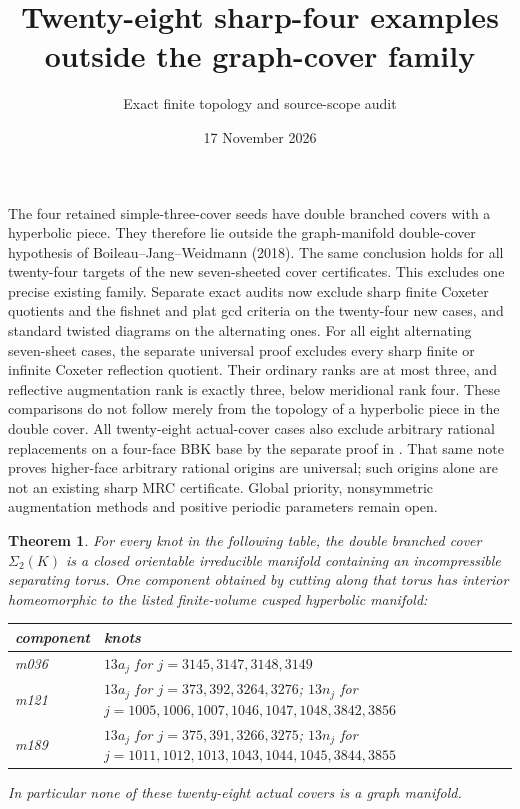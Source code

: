 \documentclass[11pt]{article}
\title{Twenty-eight sharp-four examples outside the graph-cover family}
\author{Exact finite topology and source-scope audit}
\date{17 November 2026}
\newtheorem{theorem}{Theorem}
\begin{document}
\maketitle

The four retained simple-three-cover seeds have double branched covers
with a hyperbolic piece. They therefore lie outside the graph-manifold
double-cover hypothesis of Boileau--Jang--Weidmann (2018).
The same conclusion holds for all twenty-four targets of the new seven-sheeted cover certificates.
This excludes one precise existing family. Separate exact audits now
exclude sharp finite Coxeter quotients and the fishnet and plat gcd
criteria on the twenty-four new cases, and standard twisted diagrams
on the alternating ones. For all eight alternating seven-sheet cases,
the separate universal proof excludes every sharp finite or infinite
Coxeter reflection quotient. Their ordinary ranks are at most three,
and reflective augmentation rank is exactly three, below meridional
rank four. These comparisons do not follow merely from the topology
of a hyperbolic piece in the double cover.
All twenty-eight actual-cover cases also exclude arbitrary rational
replacements on a four-face BBK base by the separate proof in
. That same note proves
higher-face arbitrary rational origins are universal; such origins
alone are not an existing sharp MRC certificate.
Global priority, nonsymmetric augmentation methods and positive
periodic parameters remain open.

\begin{theorem}\label{thm:outside}
For every knot in the following table, the double branched cover
$\Sigma_2(K)$ is a closed orientable irreducible manifold containing an
incompressible separating torus. One component obtained by cutting
along that torus has interior homeomorphic to the listed finite-volume
cusped hyperbolic manifold:
\begin{center}\small
\begin{tabular}{lp{11.4cm}}
\toprule
component & knots\\
\midrule
m036 & $13a_j$ for $j=3145,3147,3148,3149$\\[2pt]
m121 & $13a_j$ for $j=373,392,3264,3276$;\newline
$13n_j$ for $j=1005,1006,1007,1046,1047,1048,3842,3856$\\[2pt]
m189 & $13a_j$ for $j=375,391,3266,3275$;\newline
$13n_j$ for $j=1011,1012,1013,1043,1044,1045,3844,3855$\\
\bottomrule
\end{tabular}
\end{center}
In particular none of these twenty-eight actual covers is a graph manifold.
\end{theorem}
\end{document}

